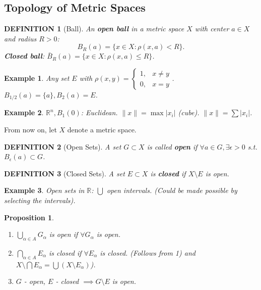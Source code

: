 \documentclass[12pt]{article}
\theoremstyle{blueplain}
\newtheorem{proposition}[theorem]{Proposition}
\theoremstyle{bluedef}
\newtheorem{definition}{DEFINITION}[section]
\theoremstyle{blueremark}
\newtheorem{example}{Example}[section]
\newcommand{\R}{\mathbb{R}}
\numberwithin{equation}{section}
\begin{document}
      \clearpage

      \subsection{Topology of Metric Spaces}

      \begin{definition}[Ball]
        An \textbf{open ball} in a metric space $X$ with center $a \in X$ and radius $R > 0$:
        \[ B_R(a) = \{ x \in X : \rho(x, a) < R \}. \]
        \textbf{Closed ball}: $\bar{B}_R(a) = \{ x \in X : \rho(x, a) \leq R \}$.
      \end{definition}

      \begin{example}
        Any set $E$ with $\rho(x, y) = \begin{cases} 1, & x \neq y \\ 0, & x = y \end{cases}$.
        $B_{1/2}(a) = \{a\}, B_2(a) = E$.
      \end{example}

      \begin{example}
        $\R^n, B_1(0)$: Euclidean.
        $\|x\| = \max |x_i|$ (cube).
        $\|x\| = \sum |x_i|$.
      \end{example}

      From now on, let $X$ denote a metric space.

      \begin{definition}[Open Sets]
        A set $G \subset X$ is called \textbf{open} if $\forall a \in G, \exists \epsilon > 0$ s.t. $B_\epsilon(a) \subset G$.
      \end{definition}

      \begin{definition}[Closed Sets]
        A set $E \subset X$ is \textbf{closed} if $X \setminus E$ is open.
      \end{definition}


      \begin{example}
        Open sets in $\R$: $\bigcup$ open intervals.
        (Could be made possible by selecting the intervals).
      \end{example}

      \begin{proposition}
        \begin{enumerate}
          \item $\bigcup_{\alpha \in A} G_\alpha$ is open if $\forall G_\alpha$ is open.
          \item $\bigcap_{\alpha \in A} E_\alpha$ is closed if $\forall E_\alpha$ is closed.
                (Follows from 1) and $X \setminus \bigcap E_\alpha = \bigcup (X \setminus E_\alpha)$).
          \item $G$ - open, $E$ - closed $\implies G \setminus E$ is open.
        \end{enumerate}
      \end{proposition}
\end{document}

